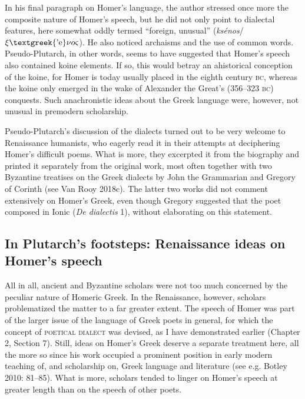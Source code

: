 \begin{styleQuote}
\zeta o\upsilon \sigma \iota $ $\tau {}$ $\sigma \varepsilon \mu \nu {}\nu $ $\tau o$ $\lambda {}\gamma o\upsilon $”.}
\end{styleQuote}

\begin{styleStandard}
In his final paragraph on Homer’s language, the author stressed once more the composite nature of Homer’s speech, but he did not only point to dialectal features, here somewhat oddly termed “foreign, unusual” (\textit{ksénos}/$\xi \text{\textgreek{'e}}\nu o\varsigma $). He also noticed archaisms and the use of common words. Pseudo-Plutarch, in other words, seems to have suggested that Homer’s speech also contained koine elements. If so, this would betray an ahistorical conception of the koine, for Homer is today usually placed in the eighth century \textsc{bc}, whereas the koine only emerged in the wake of Alexander the Great’s (356–323 \textsc{bc}) conquests. Such anachronistic ideas about the Greek language were, however, not unusual in premodern scholarship.
\end{styleStandard}

\begin{styleStandard}
Pseudo-Plutarch’s discussion of the dialects turned out to be very welcome to Renaissance humanists, who eagerly read it in their attempts at deciphering Homer’s difficult poems. What is more, they excerpted it from the biography and printed it separately from the original work, most often together with two Byzantine treatises on the Greek dialects by John the Grammarian and Gregory of Corinth (see Van Rooy 2018c). The latter two works did not comment extensively on Homer’s Greek, even though Gregory suggested that the poet composed in Ionic (\textit{De dialectis }1), without elaborating on this statement.
\end{styleStandard}

\subsection{In Plutarch’s footsteps: Renaissance ideas on Homer’s speech}
\hypertarget{Toc19704828}{}\begin{styleStandard}
All in all, ancient and Byzantine scholars were not too much concerned by the peculiar nature of Homeric Greek. In the Renaissance, however, scholars problematized the matter to a far greater extent. The speech of Homer was part of the larger issue of the language of Greek poets in general, for which the concept of \textsc{poetical dialect} was devised, as I have demonstrated earlier (Chapter 2, Section 7). Still, ideas on Homer’s Greek deserve a separate treatment here, all the more so since his work occupied a prominent position in early modern teaching of, and scholarship on, Greek language and literature (see e.g. Botley 2010: 81–85). What is more, scholars tended to linger on Homer’s speech at greater length than on the speech of other poets.
\end{styleStandard}

